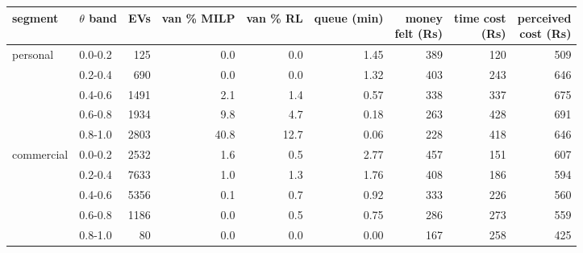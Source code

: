 \footnotesize
\begin{adjustbox}{max width=\linewidth}
\begin{tabular}{@{}llrrrrrrr@{}}
\toprule
segment & \shortstack{$\theta$\\band} & EVs & van \% MILP & van \% RL & queue (min) & \shortstack{money\\felt (Rs)} & \shortstack{time cost\\(Rs)} & \shortstack{perceived\\cost (Rs)} \\
\midrule
personal & 0.0-0.2 & 125 & 0.0 & 0.0 & 1.45 & 389 & 120 & 509 \\
 & 0.2-0.4 & 690 & 0.0 & 0.0 & 1.32 & 403 & 243 & 646 \\
 & 0.4-0.6 & 1491 & 2.1 & 1.4 & 0.57 & 338 & 337 & 675 \\
 & 0.6-0.8 & 1934 & 9.8 & 4.7 & 0.18 & 263 & 428 & 691 \\
 & 0.8-1.0 & 2803 & 40.8 & 12.7 & 0.06 & 228 & 418 & 646 \\
\midrule
commercial & 0.0-0.2 & 2532 & 1.6 & 0.5 & 2.77 & 457 & 151 & 607 \\
 & 0.2-0.4 & 7633 & 1.0 & 1.3 & 1.76 & 408 & 186 & 594 \\
 & 0.4-0.6 & 5356 & 0.1 & 0.7 & 0.92 & 333 & 226 & 560 \\
 & 0.6-0.8 & 1186 & 0.0 & 0.5 & 0.75 & 286 & 273 & 559 \\
 & 0.8-1.0 & 80 & 0.0 & 0.0 & 0.00 & 167 & 258 & 425 \\
\bottomrule
\end{tabular}
\end{adjustbox}

